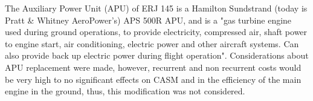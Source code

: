 The Auxiliary Power Unit (APU) of ERJ 145 is a Hamilton Sundstrand (today is Pratt & Whitney AeroPower's) APS 500R APU, and is a "gas turbine engine used during ground operations, to provide electricity, compressed air, shaft power to engine start, air conditioning, electric power and other aircraft systems. Can also provide back up electric power during flight operation".
Considerations about APU replacement were made, however, recurrent and non recurrent costs would be very high to no significant effects on CASM and in the efficiency of the main engine in the ground, thus, this modification was not considered.
